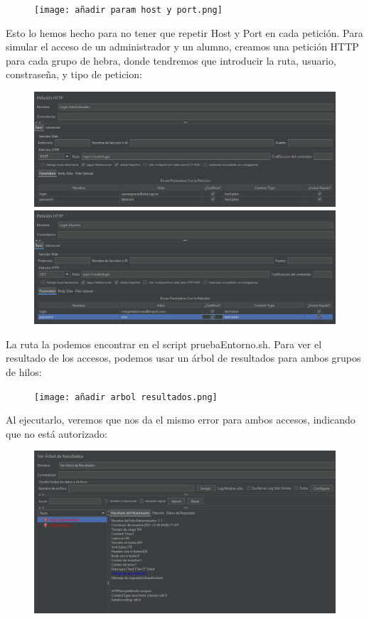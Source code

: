 \documentclass[a4paper]{article}
\begin{document}
\begin{figure}[hbt!]
    \texttt{[image: añadir param host y port.png]}
\end{figure}
\newline Esto lo hemos hecho para no tener que repetir Host y Port en cada petición.
Para simular el acceso de un administrador y un alumno, creamos una petición HTTP para
cada grupo de hebra, donde tendremos que introducir la ruta, usuario, constraseña, y tipo de peticion:
\begin{figure}[hbt!]
    \includegraphics[width=\textwidth]{login administrador.png}
    \includegraphics[width=\textwidth]{login alumno.png}
\end{figure}
\newline La ruta la podemos encontrar en el script pruebaEntorno.sh.
Para ver el resultado de los accesos, podemos usar un árbol de resultados para ambos
grupos de hilos:
\begin{figure}[hbt!]
    \texttt{[image: añadir arbol resultados.png]}
\end{figure}
\newline Al ejecutarlo, veremos que nos da el mismo error para ambos accesos, indicando 
que no está autorizado:
\begin{figure}[hbt!]
    \includegraphics[width=\textwidth]{errores arbol resultados.png}
\end{figure}
\end{document}
